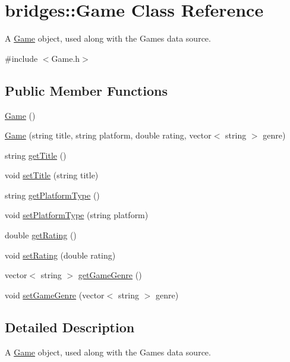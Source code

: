 \hypertarget{classbridges_1_1_game}{}\section{bridges\+:\+:Game Class Reference}
\label{classbridges_1_1_game}


A \hyperlink{classbridges_1_1_game}{Game} object, used along with the Games data source.  




{\ttfamily \#include $<$Game.\+h$>$}

\subsection*{Public Member Functions}
\begin{DoxyCompactItemize}
\item 
\hyperlink{classbridges_1_1_game_a44f625a03ebf144931aa9e7e5440303c}{Game} ()
\item 
\hyperlink{classbridges_1_1_game_ab8064a35bca85871e7088f351ce86af1}{Game} (string title, string platform, double rating, vector$<$ string $>$ genre)
\item 
string \hyperlink{classbridges_1_1_game_a66917b204312a7996585e5d4b56a1add}{get\+Title} ()
\item 
void \hyperlink{classbridges_1_1_game_a6cfbd26183eb1202ea29b9f005dfb76b}{set\+Title} (string title)
\item 
string \hyperlink{classbridges_1_1_game_a6b7ff7e0fa411787338c70942cf0ebcb}{get\+Platform\+Type} ()
\item 
void \hyperlink{classbridges_1_1_game_a30d2c5800f2f3696162f5a3295325a3e}{set\+Platform\+Type} (string platform)
\item 
double \hyperlink{classbridges_1_1_game_a8deb9c403f2e16bede39a1486829742d}{get\+Rating} ()
\item 
void \hyperlink{classbridges_1_1_game_a0b9b3180975b2d3028b9090559bb6624}{set\+Rating} (double rating)
\item 
vector$<$ string $>$ \hyperlink{classbridges_1_1_game_a163f4abb299d588a5987c24e4e7bea05}{get\+Game\+Genre} ()
\item 
void \hyperlink{classbridges_1_1_game_a973e89486663131ab9095c93d4d62e81}{set\+Game\+Genre} (vector$<$ string $>$ genre)
\end{DoxyCompactItemize}


\subsection{Detailed Description}
A \hyperlink{classbridges_1_1_game}{Game} object, used along with the Games data source. 

